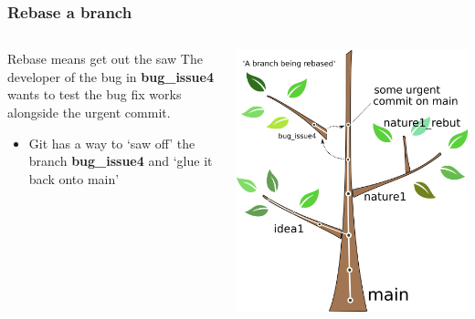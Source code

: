 \documentclass{beamer}
\begin{document}
\begin{frame}
  \frametitle{Rebase a branch}
  \begin{columns}[T]
    \begin{column}{.5\textwidth}
      \begin{block}{\alert{Rebase} means get out the saw}
        The developer of the bug in \textbf{bug\_issue4} wants to test the bug
        fix works alongside the urgent commit.
        \begin{itemize}
          \item Git has a way to `saw off' the branch  \textbf{bug\_issue4}
            and `glue it back onto main'
        \end{itemize}
      \end{block}
    \end{column}
    \begin{column}{.5\textwidth}
      \includegraphics[width=\textwidth]{tree_rebase2.png}
    \end{column}
  \end{columns}
\end{frame}
\end{document}
